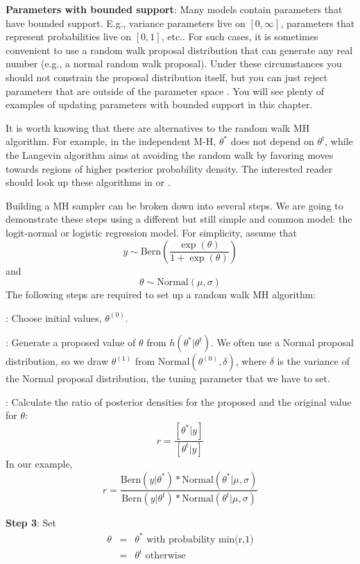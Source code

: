 {\bf Parameters with bounded support}: Many models contain parameters
that have bounded support. E.g., variance parameters live on
$[0,\infty]$, parameters that represent probabilities live on $[0,1]$,
etc..  For such cases, it is sometimes convenient to use a random walk
proposal distribution that can generate any real number (e.g., a
normal random walk proposal). Under these circumstances you should not
constrain the proposal distribution itself, but you can just reject
parameters that are outside of the parameter space
\citep{robert_casella:2010}. You will see plenty of examples of
updating parameters with bounded support in this chapter.

It is worth
knowing that there are alternatives to the random walk MH algorithm. For
example, in the independent M-H, $\theta^{*}$ does not depend on
$\theta^{t}$, while the Langevin algorithm \citep{roberts_etal:1998}
aims at avoiding the random walk by favoring moves towards regions of
higher posterior probability density. The interested reader should
look up these algorithms in \citet{robert_casella:2004} or
\citet{robert_casella:2010}.

Building a MH sampler can be broken down into several steps. We are going to demonstrate these steps using a different but still simple and common model: the logit-normal or logistic regression model. For simplicity, assume that
\[
y \sim \mbox{Bern} \left(\frac{\exp(\theta)}{1+ \exp(\theta)}\right)
\]
and
\[
\theta \sim \mbox{Normal}(\mu, \sigma)
\]
The following steps are required to set up a random walk MH algorithm:

{: Choose initial values, $\theta^{(0)}$.}

{: Generate a proposed value of $\theta$ from $h(\theta^{*}|\theta^{t})$. }
We often use a Normal proposal distribution, so we draw $\theta^{(1)}$ from $\mbox{Normal}(\theta^{(0)}, \delta)$, where $\delta$ is the variance of the Normal proposal distribution, the tuning parameter that we have to set.

{: Calculate the ratio of posterior densities for the proposed and the original value for $\theta$: }
\[
r = \frac{[\theta^{*}|y]}  {[\theta^{t}|y]}
\]
In our example,
\[
r = \frac{\mbox{Bern}(y|\theta^{*}) * \mbox{Normal}(\theta^{*}|\mu, \sigma)} {\mbox{Bern}(y|\theta^{t}) * \mbox{Normal}(\theta^{t}|\mu, \sigma)}
\]


{\bf Step 3}: Set
\begin{eqnarray*}
\theta  &= &   \theta^{*} \mbox{ with probability min(r,1)}\\
	 & = & 	\theta^{t} \mbox{ otherwise }
\end{eqnarray*}

